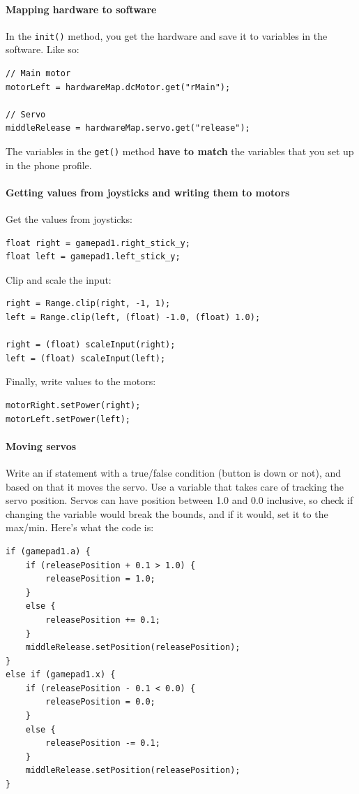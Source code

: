 \documentclass[12p,a4papert]{article}
\begin{document}
\paragraph{Mapping hardware to software}In the \verb!init()! method, you get the hardware and save it to variables in the software. Like so:
\begin{verbatim}
// Main motor
motorLeft = hardwareMap.dcMotor.get("rMain");

// Servo
middleRelease = hardwareMap.servo.get("release");
\end{verbatim}
The variables in the \verb!get()! method \textbf{have to match} the variables that you set up in the phone profile.
\paragraph{Getting values from joysticks and writing them to motors}
Get the values from joysticks:
\begin{verbatim}
float right = gamepad1.right_stick_y;
float left = gamepad1.left_stick_y;
\end{verbatim}
Clip and scale the input:
\begin{verbatim}
right = Range.clip(right, -1, 1);
left = Range.clip(left, (float) -1.0, (float) 1.0);
        
right = (float) scaleInput(right);
left = (float) scaleInput(left);
\end{verbatim}
Finally, write values to the motors:
\begin{verbatim}
motorRight.setPower(right);
motorLeft.setPower(left);
\end{verbatim}
\paragraph{Moving servos} Write an if statement with a true/false condition (button is down or not), and based on that it moves the servo. Use a variable that takes care of tracking the servo position. Servos can have position between 1.0 and 0.0 inclusive, so check if changing the variable would break the bounds, and if it would, set it to the max/min. Here's what the code is:
\begin{verbatim}
if (gamepad1.a) {
	if (releasePosition + 0.1 > 1.0) {
		releasePosition = 1.0;
	} 
	else {
		releasePosition += 0.1;
	}
	middleRelease.setPosition(releasePosition);
} 
else if (gamepad1.x) {
	if (releasePosition - 0.1 < 0.0) {
		releasePosition = 0.0;
	} 
	else {
		releasePosition -= 0.1;
	}
	middleRelease.setPosition(releasePosition);
}
\end{verbatim}
\end{document}
